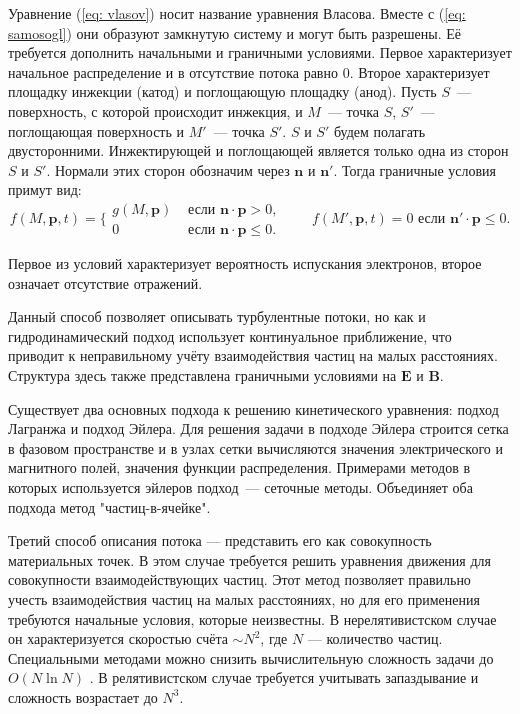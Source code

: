 \documentclass[a4paper,14pt]{extreport} %
\renewcommand{\vec}[1]{\bm{#1}}
\begin{document}
Уравнение (\ref{eq: vlasov}) носит название уравнения Власова. Вместе с (\ref{eq: samosogl}) они образуют замкнутую систему и могут быть разрешены. Её требуется дополнить начальными и граничными условиями. Первое характеризует начальное распределение и в отсутствие потока равно 0. Второе характеризует площадку инжекции (катод) и поглощающую площадку (анод). Пусть $S$~--- поверхность, с которой происходит инжекция, и $M$~--- точка $S$, $S'$~--- поглощающая поверхность и $M'$~--- точка $S'$. $S$ и $S'$ будем полагать двусторонними. Инжектирующей и поглощающей является только одна из сторон $S$ и $S'$. Нормали этих сторон обозначим через $\vec{n}$ и $\vec{n}'$. Тогда граничные условия примут вид:
\begin{equation}\label{eq: gran}
f(M, \vec{p}, t) = \Bigg\{
{
	\begin{split}
	g(M, \vec{p}) & \text{ если }\vec{n}\cdot\vec{p}>0, \\
	0 &\text{ если }\vec{n}\cdot\vec{p}\leqslant 0.
	\end{split}
}
\qquad
f(M',\vec{p}, t) = 0 \text{ если } \vec{n}'\cdot\vec{p}\leqslant 0.
\end{equation}

Первое из условий характеризует вероятность испускания электронов, второе означает отсутствие отражений.

Данный способ позволяет описывать турбулентные потоки, но как и гидродинамический подход использует континуальное приближение, что приводит к неправильному учёту взаимодействия частиц на малых расстояниях. Структура здесь также представлена граничными условиями на $\vec{E}$ и $\vec{B}$. 

Существует два основных подхода к решению кинетического уравнения: подход Лагранжа и подход Эйлера. Для решения задачи в подходе Эйлера строится сетка в фазовом пространстве и в узлах сетки вычисляются значения электрического и магнитного полей, значения функции распределения. Примерами методов в которых используется эйлеров подход~--- сеточные методы. Объединяет оба подхода метод "частиц-в-ячейке".

Третий способ описания потока --- представить его как совокупность материальных точек. В этом случае требуется решить уравнения движения для совокупности взаимодействующих частиц. Этот метод позволяет правильно учесть взаимодействия частиц на малых расстояниях, но для его применения требуются начальные условия, которые неизвестны. В нерелятивистском случае он характеризуется скоростью счёта $\sim N^2$, где $N$ --- количество частиц. Специальными методами можно снизить вычислительную сложность задачи до $O(N\ln N)$ \cite{AlgoritmO(N)}. В релятивистском случае требуется учитывать запаздывание и сложность возрастает до $N^3$.
\end{document}
